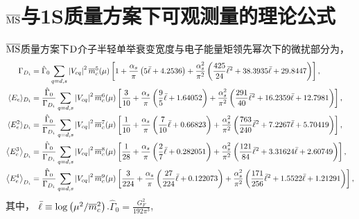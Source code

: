 \chapter{$\overline{\mathrm{MS}}$与1S质量方案下可观测量的理论公式}
\label{app:TOS}
$\overline{\mathrm{MS}}$质量方案下$\mathrm{D}$介子半轻单举衰变宽度与电子能量矩领先幂次下的微扰部分为，
\begin{equation}
\begin{aligned}
    \Gamma_{D_{i}}&=\hat{\Gamma}_0 \sum_{q=d,s}\left|V_{cq}\right|^2 \overline{m}_c^5(\mu) \left[ 1 +\frac{\alpha_s}{\pi} \left(5 \bar{\ell}+4.2536 \right) + \frac{\alpha_s^2}{\pi^2}\left(\frac{425}{24} \bar{\ell}^2+38.3935 \bar{\ell}+29.8447 \right)  \right]  ,\\ 
    \langle E_{e}\rangle_{D_{i}}&=\frac{\hat{\Gamma}_0}{    \Gamma_{D_{i}}}\sum_{q=d,s} \left|V_{cq}\right|^2 \overline{m}_c^6(\mu) \left[\frac{3}{10} + \frac{\alpha_{s}}{\pi} \left(\frac{9}{5} \bar{\ell}+1.64052\right) + \frac{\alpha_s^2}{\pi^2}\left(\frac{291}{40} \bar{\ell}^2+16.2359 \bar{\ell}+12.7981\right) \right],\nonumber \\
    \langle E_{e}^{2} \rangle_{D_{i}} &=\frac{\hat{\Gamma}_0}{\Gamma_{D_{i}}} \sum_{q=d,s}\left|V_{cq}\right|^2 \overline{m}_c^7(\mu) \left[ \frac{1}{10} + \frac{\alpha_{s}}{\pi} \left(\frac{7}{10} \bar{\ell}+0.66823\right)  + \frac{\alpha_s^2}{\pi^2}\left(\frac{763}{240} \bar{\ell}^2+7.2267 \bar{\ell}+5.70419\right)  \right], \nonumber \\
    \left\langle E_e^3\right\rangle_{D_{i}}&=\frac{\hat{\Gamma}_0}{\Gamma_{D_{i}}}\sum_{q=d,s}\left|V_{cq}\right|^2 \overline{m}_c^8(\mu) \left[\frac{1}{28} + \frac{\alpha_{s}}{\pi} \left(\frac{2}{7} \bar{\ell}+0.282051\right)  + \frac{\alpha_s^2}{\pi^2}\left(\frac{121}{84} \bar{\ell}^2+3.31624 \bar{\ell}+2.60749\right)   \right],\nonumber \\
    \left\langle E_e^4\right\rangle_{D_i}&=\frac{\hat{\Gamma}_0}{\Gamma_{D_{i}}}\sum_{q=d,s}\left|V_{cq}\right|^2 \overline{m}_c^9(\mu) \left[\frac{3}{224} + \frac{\alpha_{s}}{\pi} \left(\frac{27}{224} \bar{\ell}+0.122073\right)  + \frac{\alpha_s^2}{\pi^2}\left(\frac{171}{256} \bar{\ell}^2+1.5522 \bar{\ell}+1.21291\right)  \right],\nonumber 
    \end{aligned}
    \label{eq:msbar}
\end{equation}
其中， $\bar{\ell}\equiv \log\left({\mu^2}/{\overline{m}_c^2}\right)$.$\hat{\Gamma}_{0}=\frac{G_F^2}{192\pi^3}$,

